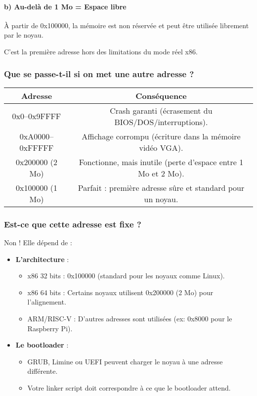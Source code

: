\documentclass{article}
\begin{document}
\paragraph{b) Au-delà de 1 Mo = Espace libre}

À partir de 0x100000, la mémoire est non réservée et peut être utilisée librement par le noyau.

C’est la première adresse hors des limitations du mode réel x86.

\subsubsection*{Que se passe-t-il si on met une autre adresse ?}

\begin{center}
\begin{tabular}{|c|c|}
\hline
\textbf{Adresse} & \textbf{Conséquence} \\
\hline
0x0–0x9FFFF & Crash garanti (écrasement du BIOS/DOS/interruptions). \\
0xA0000–0xFFFFF & Affichage corrompu (écriture dans la mémoire vidéo VGA). \\
0x200000 (2 Mo) & Fonctionne, mais inutile (perte d’espace entre 1 Mo et 2 Mo). \\
0x100000 (1 Mo) & Parfait : première adresse sûre et standard pour un noyau. \\
\hline
\end{tabular}
\end{center}

\subsubsection*{Est-ce que cette adresse est fixe ?}

Non ! Elle dépend de :

\begin{itemize}
    \item \textbf{L’architecture} :
    \begin{itemize}
        \item x86 32 bits : 0x100000 (standard pour les noyaux comme Linux).
        \item x86 64 bits : Certains noyaux utilisent 0x200000 (2 Mo) pour l’alignement.
        \item ARM/RISC-V : D’autres adresses sont utilisées (ex: 0x8000 pour le Raspberry Pi).
    \end{itemize}
    \item \textbf{Le bootloader} :
    \begin{itemize}
        \item GRUB, Limine ou UEFI peuvent charger le noyau à une adresse différente.
        \item Votre linker script doit correspondre à ce que le bootloader attend.
    \end{itemize}
\end{itemize}
\end{document}
